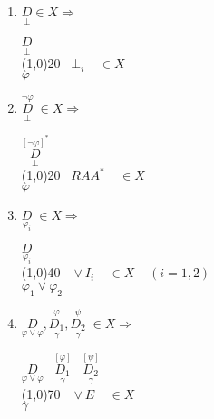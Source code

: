 \documentclass{article}
\theoremstyle{break}
\theoremstyle{break}
\theoremstyle{break}
\theoremstyle{break}
\begin{document}
\begin{enumerate}
    \item \( \underset{\bot}{D} \in X \Rightarrow \)
        \begin{center}
             \(
            \underset{\bot}{D}
            \)\\
            \hspace{2.2cm}\line(1,0){20}\(\;\;\; \bot_i\;\;\;\; \in X\;\;\;\;\)\\  
             \( \varphi \)
        \end{center}

    \item \( \underset{\bot}{\stackrel{\neg \varphi}{D}}\; \in X \Rightarrow \)
        \begin{center}
             \(
             \underset{\bot}{\stackrel{[\neg \varphi]^*}{D}}
            \)\\
            \hspace{2.8cm}\line(1,0){20}\(\;\;\; RAA^*\;\;\;\; \in X\;\;\;\;\)\\  
             \( \varphi \)
        \end{center}

    \item \( \underset{\varphi_i}{D}\; \in X \Rightarrow \)
        \begin{center}
             \(
             \underset{\varphi_i}{D}
            \)\\
            \hspace{3.6cm}\line(1,0){40}\(\;\;\; \vee I_i\;\;\;\; \in X\;\;\;\;(i = 1,2)\)\\  
             \( \varphi_1 \vee \varphi_2 \)
        \end{center}

    \item \( \underset{\varphi \vee \varphi}{D}, \underset{\gamma}{\stackrel{\varphi}{D_1}}, \underset{\gamma}{\stackrel{\psi}{D_2}}\;\in X \Rightarrow \)
        \begin{center}
             \(
             \underset{\varphi \vee \varphi}{D}\;\;\; \underset{\gamma}{\stackrel{[\varphi]}{D_1}}\;\;\; \underset{\gamma}{\stackrel{[\psi]}{D_2}}
            \)\\
            \hspace{2cm}\line(1,0){70}\(\;\;\; \vee E\;\;\;\; \in X\)\\  
             \( \gamma \)
        \end{center}


\end{enumerate}
\end{document}
